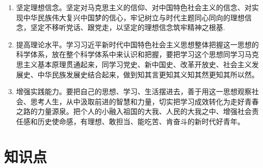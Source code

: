 \documentclass[12pt, a4paper, oneside]{ctexbook}
\begin{document}
\begin{enumerate}
\item 坚定理想信念。坚定对马克思主义的信仰、对中国特色社会主义的信念、对实现中华民族伟大复兴中国梦的信心，牢记树立与时代主题同心同向的理想信念，坚定不移听党话、跟党走，以坚定的理想信念筑牢精神之根基.

\item 提高理论水平。学习习近平新时代中国特色社会主义思想整体把握这一思想的科学体系，放在整个科学体系中来认识和把握，要把学习这个思想同学习马克思主义基本原理贯通起来，同学习党史、新中国史、改革开放史、社会主义发展史、中华民族发展史结合起来，做到知其言更知其义知其然更知其所以然。

\item 增强实践能力。要把自己的思想、学习、生活摆进去，善于用这一思想观察社会、思考人生，从中汲取前进的智慧和力量，切实把学习成效转化为走好青春之路的力量源泉。把个人的小融入祖国的大我、人民的大我之中、增强社会责任感和历史使命感，有理想、敢担当、能吃苦、肯奋斗的新时代好青年。
\end{enumerate}


\section{知识点}
\end{document}

